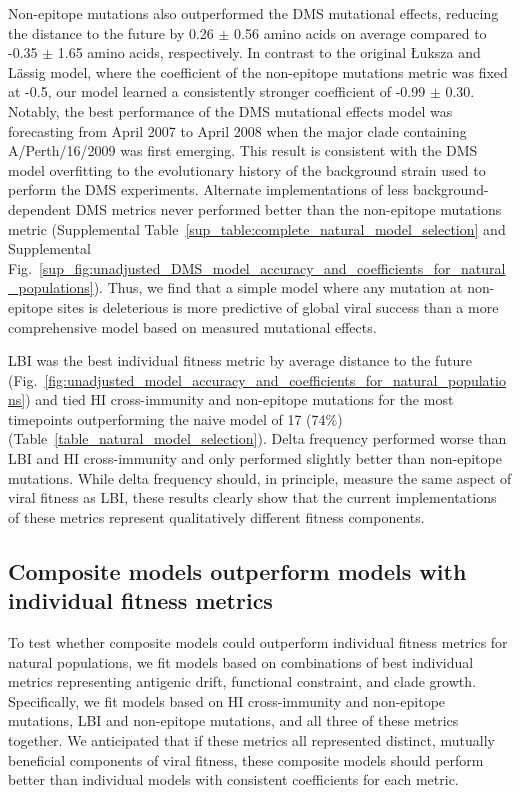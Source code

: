Non-epitope mutations also outperformed the DMS mutational effects, reducing the distance to the future by 0.26 $\pm$ 0.56 amino acids on average compared to -0.35 $\pm$ 1.65 amino acids, respectively.
In contrast to the original {\L}uksza and L\"assig \cite{Luksza:2014hj} model, where the coefficient of the non-epitope mutations metric was fixed at -0.5, our model learned a consistently stronger coefficient of -0.99 $\pm$ 0.30.
Notably, the best performance of the DMS mutational effects model was forecasting from April 2007 to April 2008 when the major clade containing A/Perth/16/2009 was first emerging.
This result is consistent with the DMS model overfitting to the evolutionary history of the background strain used to perform the DMS experiments.
Alternate implementations of less background-dependent DMS metrics never performed better than the non-epitope mutations metric (Supplemental Table~\ref{sup_table:complete_natural_model_selection} and Supplemental Fig.~\ref{sup_fig:unadjusted_DMS_model_accuracy_and_coefficients_for_natural_populations}).
Thus, we find that a simple model where any mutation at non-epitope sites is deleterious is more predictive of global viral success than a more comprehensive model based on measured mutational effects.

LBI was the best individual fitness metric by average distance to the future (Fig.~\ref{fig:unadjusted_model_accuracy_and_coefficients_for_natural_populations}) and tied HI cross-immunity and non-epitope mutations for the most timepoints outperforming the naive model of 17 (74\%) (Table~\ref{table_natural_model_selection}).
Delta frequency performed worse than LBI and HI cross-immunity and only performed slightly better than non-epitope mutations.
While delta frequency should, in principle, measure the same aspect of viral fitness as LBI, these results clearly show that the current implementations of these metrics represent qualitatively different fitness components.

\subsection*{Composite models outperform models with individual fitness metrics}

To test whether composite models could outperform individual fitness metrics for natural populations, we fit models based on combinations of best individual metrics representing antigenic drift, functional constraint, and clade growth.
Specifically, we fit models based on HI cross-immunity and non-epitope mutations, LBI and non-epitope mutations, and all three of these metrics together.
We anticipated that if these metrics all represented distinct, mutually beneficial components of viral fitness, these composite models should perform better than individual models with consistent coefficients for each metric.

